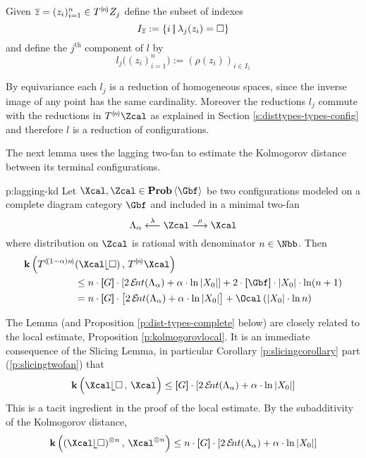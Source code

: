   Given $\overline z=(z_{i})_{i=1}^{n}\in T^{(\!n\!)}Z_{j} $ define the
  subset of indexes
  \[
    I_{\overline z}
    :=
    \left\{i\,\middle\vert\mkern-3mu\middle|\, \lambda_{j}(z_{i})=\square \right\}
  \]
  and define the $j^{\text{th}}$ component of $l$ by 
  \[
    l_{j}\big((z_{i})_{i=1}^{n}\big)
    :=
    (\rho(z_{i}))_{i\in I_{\bar z}}
  \]

  By equivariance each $l_{j}$ is a reduction of homogeneous spaces,
  since the inverse image of any point has the same
  cardinality. Moreover the reductions $l_{j}$ commute with the reductions in
  $T^{\c{n}}\Zcal$ as explained in Section \ref{s:disttypes-types-config}
  and therefore $l$ is a reduction of configurations.

  The next lemma uses the lagging two-fan to estimate the
  Kolmogorov distance between its terminal configurations.
 
  \begin{lemma}{p:lagging-kd}
    Let $\Xcal,\Zcal\in\prob\<\Gbf>$ be
    two configurations modeled on a complete diagram category $\Gbf$
    and included in a minimal two-fan
    \[
      \Lambda_\alpha
      \oot[\lambda]
      \Zcal
      \too[\rho]
      \Xcal
    \]
    where distribution on $\Zcal$ is rational with denominator
    $n\in\Nbb$.  Then
    \begin{align*}
      \ikd\Big(T^{\c{(1-\alpha) n}}&(\Xcal\rel\square)\,,\,
               T^{\c{n}}\Xcal\Big)
      \\
	&
	\leq
	n\cdot\size{G}\cdot
	\left[
	2\ent(\Lambda_\alpha)+
	\alpha\cdot\ln|X_{0}| 
	\right]
	+
	2 \cdot \size{\Gbf}\cdot|X_{0}|\cdot
	\ln(n+1)
      \\
      &= 
      n\cdot\size{G}\cdot
      \big[
        2\ent(\Lambda_\alpha)+
        \alpha \cdot\ln|X_{0}|
      \big]
      + \O\left(|X_{0}|\cdot\ln n \right)
    \end{align*}
  \end{lemma}

  The Lemma (and Proposition \ref{p:dist-types-complete} below) are
  closely related to the local estimate,
  Proposition \ref{p:kolmogorovlocal}. It is an immediate consequence
  of the Slicing Lemma, in particular
  Corollary \ref{p:slicingcorollary} part (\ref{p:slicingtwofan}) that
  \[          
  \ikd\Big(\Xcal\rel\square\,,\,
  \Xcal\Big)
  \leq
  \size{G}\cdot
  \left[
    2\ent(\Lambda_\alpha)+
    \alpha\cdot\ln|X_{0}| 
    \right]
  \]
  This is a tacit ingredient in the proof of the local estimate. 
  By the subadditivity of the Kolmogorov distance, 
  \[
  \ikd\Big((\Xcal\rel\square)^{\otimes n}\,,\,
  \Xcal^{\otimes n}\Big)
  \leq
  n\cdot
  \size{G}\cdot
  \left[
    2\ent(\Lambda_\alpha)+
    \alpha\cdot\ln|X_{0}| 
    \right]
  \]

